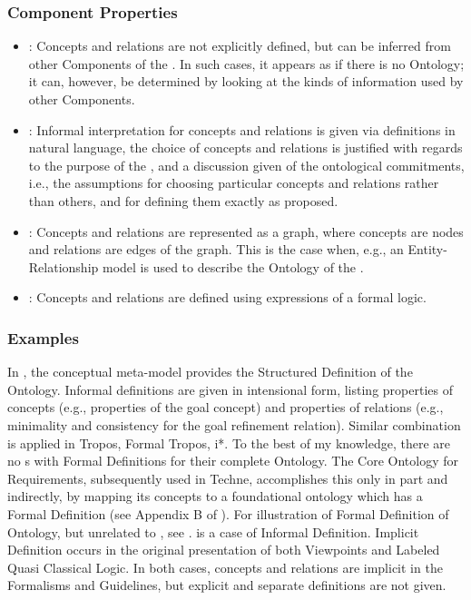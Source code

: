\documentclass[10pt, final, conference, compsocconf]{IEEEtran}
\begin{document}
\subsubsection{Component Properties}
\begin{itemize}
\item{: Concepts and relations are not explicitly defined, but can be inferred from other Components of the . In such cases, it appears as if there is no Ontology; it can, however, be determined by looking at the kinds of information used by other Components.}
\item{: Informal interpretation for concepts and relations is given via definitions in natural language, the choice of concepts and relations is justified with regards to the purpose of the , and a discussion given of the ontological commitments, i.e., the assumptions for choosing particular concepts and relations rather than others, and for defining them exactly as proposed.}
\item{: Concepts and relations are represented as a graph, where concepts are nodes and relations are edges of the graph. This is the case when, e.g., an Entity-Relationship model is used to describe the Ontology of the .}
\item{: Concepts and relations are defined using expressions of a formal logic.}
\end{itemize}

\subsubsection{Examples}
In , the conceptual meta-model provides the Structured Definition of the Ontology. Informal definitions are given in intensional form, listing properties of concepts (e.g., properties of the goal concept) and properties of relations (e.g., minimality and consistency for the goal refinement relation). Similar combination is applied in Tropos, Formal Tropos, i*. To the best of my knowledge, there are no s with Formal Definitions for their complete Ontology. The Core Ontology for Requirements, subsequently used in Techne, accomplishes this only in part and indirectly, by mapping its concepts to a foundational ontology which has a Formal Definition (see Appendix B of \cite{Jureta+:2009:AO}). For illustration of Formal Definition of Ontology, but unrelated to , see  \cite{Masolo+:2003}.  is a case of Informal Definition. Implicit Definition occurs in the original presentation of both Viewpoints and Labeled Quasi Classical Logic. In both cases, concepts and relations are implicit in the Formalisms and Guidelines, but explicit and separate definitions are not given.
\end{document}
